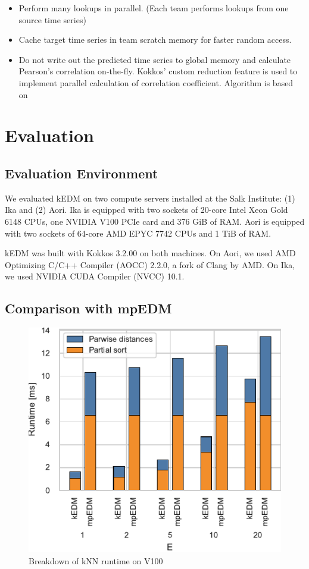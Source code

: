 \documentclass[conference]{IEEEtran}
\begin{document}
\begin{itemize}
\item Perform many lookups in parallel. (Each team performs lookups from one
    source time series)
\item Cache target time series in team scratch memory for faster random
    access.
\item Do not write out the predicted time series to global memory and
    calculate Pearson’s correlation on-the-fly. Kokkos’ custom reduction
    feature is used to implement parallel calculation of correlation
    coefficient. Algorithm is based on~\cite{Schubert2018}
\end{itemize}

\section{Evaluation}

\subsection{Evaluation Environment}


We evaluated kEDM on two compute servers installed at the Salk Institute: (1)
Ika and (2) Aori.
Ika is equipped with two sockets of 20-core Intel Xeon Gold 6148 CPUs, one
NVIDIA V100 PCIe card and 376 GiB of RAM. Aori is equipped with two sockets of
64-core AMD EPYC 7742 CPUs and 1 TiB of RAM.

kEDM was built with Kokkos 3.2.00 on both machines. On Aori, we used AMD
Optimizing C/C++ Compiler (AOCC) 2.2.0, a fork of Clang by AMD. On Ika, we
used NVIDIA CUDA Compiler (NVCC) 10.1.

\subsection{Comparison with mpEDM}

\begin{figure}
    \centering
    \includegraphics{figs/breakdown_v100}
    \caption{Breakdown of kNN runtime on V100}%
    \label{fig:architecture}
\end{figure}
\end{document}
